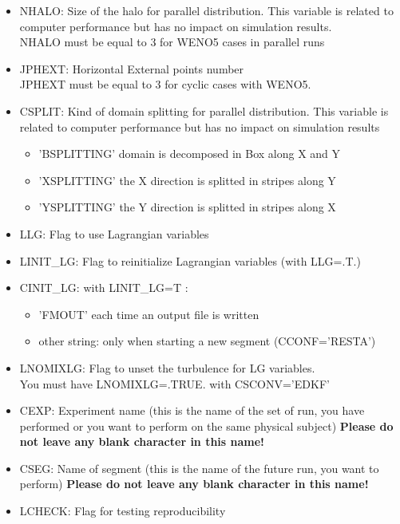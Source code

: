 \begin{itemize}
\item
NHALO: Size of the halo for parallel distribution.
This variable is related to computer performance but has no
impact on simulation results.\\
NHALO must be equal to 3 for WENO5 cases in parallel runs

\item
JPHEXT:  Horizontal External points number\\
JPHEXT must be equal to 3 for cyclic cases with WENO5.

\item
CSPLIT: Kind of domain splitting for parallel distribution.
This variable is related to computer performance but has no
impact on simulation results

\begin{itemize}
\item 'BSPLITTING' domain is decomposed in Box along X and Y
\item 'XSPLITTING' the X direction is splitted in stripes along Y
\item 'YSPLITTING' the Y direction is splitted in stripes along X
\end{itemize}

\item
LLG: Flag to use Lagrangian variables

\item
LINIT\_LG: Flag to reinitialize  Lagrangian variables (with LLG=.T.)

\item
CINIT\_LG:  with LINIT\_LG=T :
\begin{itemize}
\item 'FMOUT' each time an output file is written
\item other string: only when starting a new segment (CCONF='RESTA')
\end{itemize}

\item
LNOMIXLG: Flag to unset the turbulence for LG variables.\\
 You must have LNOMIXLG=.TRUE. with CSCONV='EDKF'

\item
CEXP: Experiment name (this is the name of the set of run, you have performed
or you want to perform on the same physical subject) 
{\bf Please do not leave any blank character in this name!}

\item
CSEG:  Name of segment (this is the name of the future run, you want to perform)
{\bf Please do not leave any blank character in this name!}

\item
LCHECK:   Flag for testing reproducibility


\end{itemize}

